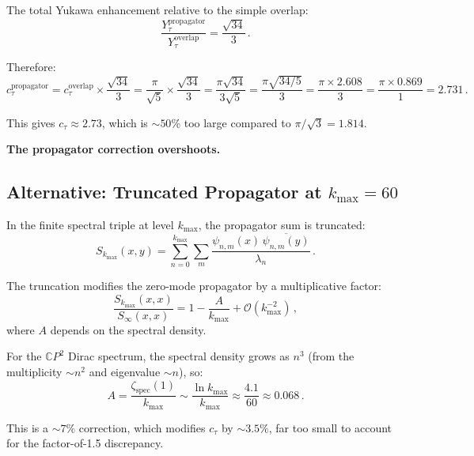 \documentclass[11pt,a4paper]{article}
\newcommand{\CP}{\mathbb{C}P}
\begin{document}
The total Yukawa enhancement relative to the simple overlap:
\begin{equation}
\frac{Y_\tau^{\mathrm{propagator}}}{Y_\tau^{\mathrm{overlap}}} = \frac{\sqrt{34}}{3}\,.
\end{equation}

Therefore:
\begin{equation}
c_\tau^{\mathrm{propagator}} = c_\tau^{\mathrm{overlap}} \times \frac{\sqrt{34}}{3} = \frac{\pi}{\sqrt{5}} \times \frac{\sqrt{34}}{3} = \frac{\pi\sqrt{34}}{3\sqrt{5}} = \frac{\pi\sqrt{34/5}}{3} = \frac{\pi \times 2.608}{3} = \frac{\pi \times 0.869}{1} = 2.731\,.
\end{equation}

This gives $c_\tau \approx 2.73$, which is $\sim 50\%$ too large compared to $\pi/\sqrt{3} = 1.814$.

\textbf{The propagator correction overshoots.}

\subsection{Alternative: Truncated Propagator at $k_{\max} = 60$}

In the finite spectral triple at level $k_{\max}$, the propagator sum is truncated:
\begin{equation}
S_{k_{\max}}(x, y) = \sum_{n=0}^{k_{\max}} \sum_m \frac{\psi_{n,m}(x)\,\overline{\psi_{n,m}(y)}}{\lambda_n}\,.
\end{equation}

The truncation modifies the zero-mode propagator by a multiplicative factor:
\begin{equation}
\frac{S_{k_{\max}}(x, x)}{S_\infty(x, x)} = 1 - \frac{A}{k_{\max}} + \mathcal{O}(k_{\max}^{-2})\,,
\end{equation}
where $A$ depends on the spectral density.

For the $\CP^2$ Dirac spectrum, the spectral density grows as $n^3$ (from the multiplicity $\sim n^2$ and eigenvalue $\sim n$), so:
\begin{equation}
A = \frac{\zeta_{\mathrm{spec}}(1)}{k_{\max}} \sim \frac{\ln k_{\max}}{k_{\max}} \approx \frac{4.1}{60} \approx 0.068\,.
\end{equation}

This is a $\sim 7\%$ correction, which modifies $c_\tau$ by $\sim 3.5\%$, far too small to account for the factor-of-1.5 discrepancy.
\end{document}
